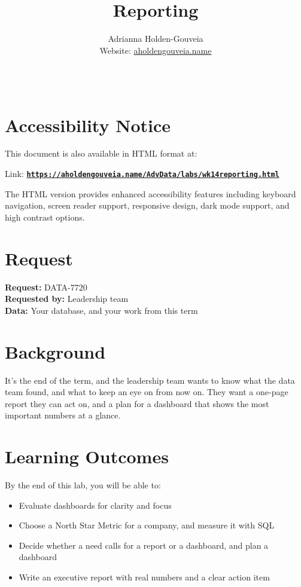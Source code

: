 \documentclass[12pt]{article}
\title{Reporting}
\author{
        Adrianna Holden-Gouveia \\
        Website: \href{https://aholdengouveia.name}{aholdengouveia.name}\\ 
        \date{\vspace{-5ex}}
        \faGithub {: aholdengouveia} \\
        }
\begin{document}
    

\maketitle



\section*{Accessibility Notice}
This document is also available in HTML format at:

Link: \href{https://aholdengouveia.name/AdvData/labs/wk14reporting.html}{\textbf{\nolinkurl{https://aholdengouveia.name/AdvData/labs/wk14reporting.html}}}

The HTML version provides enhanced accessibility features including keyboard navigation, screen reader support, responsive design, dark mode support, and high contrast options.

\section*{Request}
\noindent\textbf{Request:} DATA-7720\\
\textbf{Requested by:} Leadership team\\
\textbf{Data:} Your database, and your work from this term

\section*{Background}
It's the end of the term, and the leadership team wants to know what the data team found, and what to keep an eye on from now on. They want a one-page report they can act on, and a plan for a dashboard that shows the most important numbers at a glance.

\section*{Learning Outcomes}
By the end of this lab, you will be able to:
\begin{itemize}
    \item Evaluate dashboards for clarity and focus
    \item Choose a North Star Metric for a company, and measure it with SQL
    \item Decide whether a need calls for a report or a dashboard, and plan a dashboard
    \item Write an executive report with real numbers and a clear action item
\end{itemize}
\end{document}
